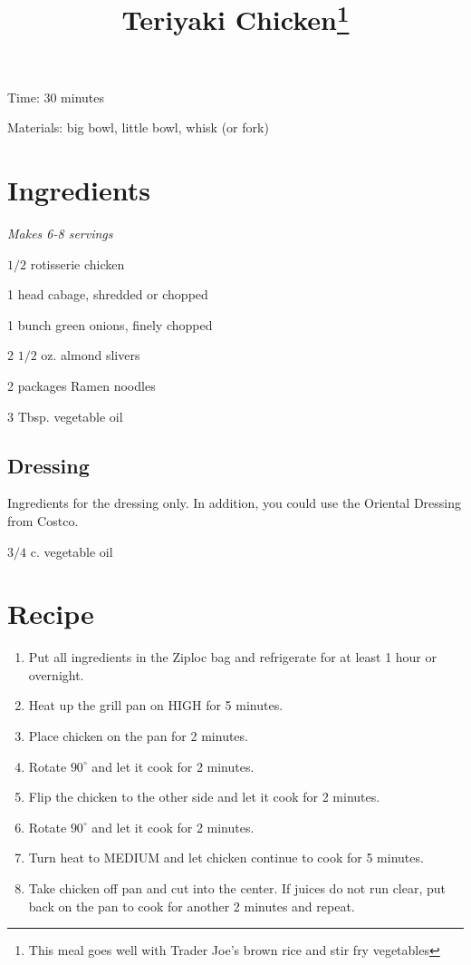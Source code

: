 \documentclass{article}
\title{Teriyaki Chicken\footnote{This meal goes well with Trader Joe's brown rice and stir fry vegetables}}
\begin{document}
Time: 30 minutes

Materials: big bowl, little bowl, whisk (or fork)

\section{Ingredients}
\textit{Makes 6-8 servings}

$1/2$ rotisserie chicken

1 head cabage, shredded or chopped

1 bunch green onions, finely chopped

2 $1/2$ oz. almond slivers

2 packages Ramen noodles

3 Tbsp. vegetable oil

\subsection{Dressing}
Ingredients for the dressing only. In addition, you could use the Oriental Dressing from Costco.

$3/4$ c. vegetable oil
\section{Recipe}
\begin{enumerate}
\item{Put all ingredients in the Ziploc bag and refrigerate for at least 1 hour or overnight.}
\item{Heat up the grill pan on HIGH for 5 minutes.}
\item{Place chicken on the pan for 2 minutes.}
\item{Rotate $90^{\circ}$ and let it cook for 2 minutes.}
\item{Flip the chicken to the other side and let it cook for 2 minutes.}
\item{Rotate $90^{\circ}$ and let it cook for 2 minutes.}
\item{Turn heat to MEDIUM and let chicken continue to cook for 5 minutes.}
\item{Take chicken off pan and cut into the center. If juices do not run clear, put back on the pan to cook for another 2 minutes and repeat.}
\end{enumerate}
\end{document}
